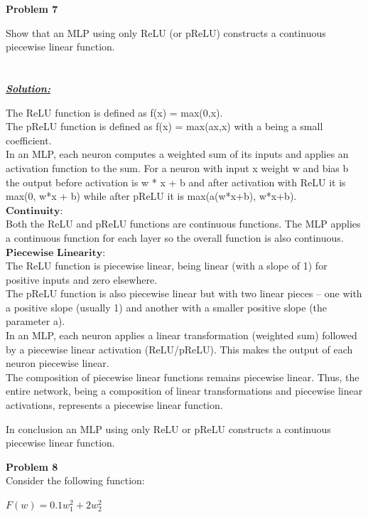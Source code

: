 \documentclass{article}
\begin{document}
\newpage
\noindent \textbf{Problem 7}

\noindent Show that an MLP using only ReLU (or pReLU) constructs a continuous piecewise linear function. \\ \\ \\

\noindent \underline{\textbf{\textit{Solution:}}}  

\noindent The ReLU function is defined as f(x) = max(0,x).\\
The pReLU function is defined as f(x) = max(ax,x) with a being a small coefficient.\\
In an MLP, each neuron computes a weighted sum of its inputs and applies an activation function to the sum. For a neuron 
with input x weight w and bias b the output before activation is w * x + b and after activation with ReLU it is max(0, w*x + b) while after pReLU it is max(a(w*x+b), w*x+b). \\

\noindent$\bm{Continuity:} $\\
Both the ReLU and pReLU functions are continuous functions. The MLP applies a continuous function for each layer so the overall function is also continuous.\\

\noindent$\bm{Piecewise}$ $ \bm{Linearity:} $\\
The ReLU function is piecewise linear, being linear (with a slope of 1) for positive inputs and zero elsewhere. \\
The pReLU function is also piecewise linear but with two linear pieces – one with a positive slope (usually 1) and another with a smaller positive slope (the parameter a). \\
In an MLP, each neuron applies a linear transformation (weighted sum) followed by a piecewise linear activation (ReLU/pReLU). This makes the output of each neuron piecewise linear. \\
The composition of piecewise linear functions remains piecewise linear. Thus, the entire network, being a composition of linear transformations and piecewise linear activations, represents a piecewise linear function.

\noindent In conclusion an MLP using only ReLU or pReLU constructs a continuous piecewise linear function.


\newpage
\noindent \textbf{Problem 8} \\
Consider the following function:
\begin{center}
    $ F(w) = 0.1w_1^2 + 2w_2^2$
\end{center}
\end{document}
